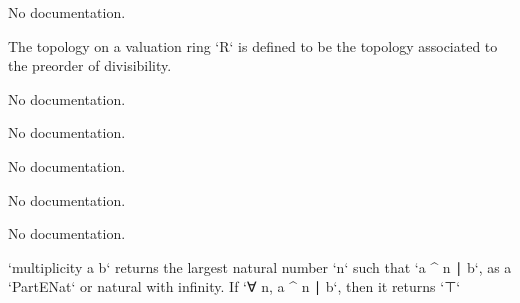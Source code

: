 \begin{theorem}\label{DiscreteValuation.leIdeal_eq_ltIdeal_add_one}
                No documentation.
    \end{theorem}

\begin{definition}\label{ValuationTopology.ValuationRing.setoid}
                The topology on a valuation ring `R` is defined to be the topology associated to the preorder of divisibility.
    \end{definition}

\begin{definition}\label{ValuationTopology.ValuationRing.ValueMonoid}
                No documentation.
    \end{definition}

\begin{definition}\label{CompleteDiscreteValuationRing}
        \leanok
                No documentation.
    \end{definition}

\begin{definition}\label{CompleteValuationField}
        \leanok
                No documentation.
    \end{definition}

\begin{definition}\label{CompleteDiscreteValuationField}
        \leanok
                No documentation.
    \end{definition}

\begin{definition}\label{ValRingHom.ramificationIndex}
                No documentation.
    \end{definition}

\begin{definition}\label{multiplicity'}
        \leanok
                `multiplicity a b` returns the largest natural number `n` such that
  `a ^ n ∣ b`, as a `PartENat` or natural with infinity. If `∀ n, a ^ n ∣ b`,
  then it returns `⊤`
    \end{definition}

